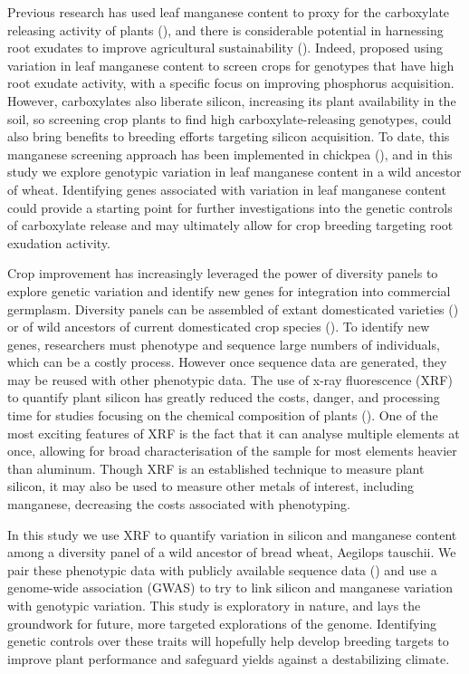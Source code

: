 \documentclass[12pt, letterpaper]{report}
\begin{document}
Previous research has used leaf manganese content to proxy for the carboxylate releasing activity of plants (\cite{lambers_leaf_2015}), and there is considerable potential in harnessing root exudates to improve agricultural sustainability (\cite{cornelis_soil_2022}). Indeed, \textcite{lambers_leaf_2015} proposed using variation in leaf manganese content to screen crops for genotypes that have high root exudate activity, with a specific focus on improving phosphorus acquisition. However, carboxylates also liberate silicon, increasing its plant availability in the soil, so screening crop plants to find high carboxylate-releasing genotypes, could also bring benefits to breeding efforts targeting silicon acquisition. To date, this manganese screening approach has been implemented in chickpea (\cite{pang_carboxylate-releasing_2018,wen2021addition}), and in this study we explore genotypic variation in leaf manganese content in a wild ancestor of wheat. Identifying genes associated with variation in leaf manganese content could provide a starting point for further investigations into the genetic controls of carboxylate release and may ultimately allow for crop breeding targeting root exudation activity. 

Crop improvement has increasingly leveraged the power of diversity panels to explore genetic variation and identify new genes for integration into commercial germplasm. Diversity panels can be assembled of extant domesticated varieties (\cite{wingen_establishing_2014}) or of wild ancestors of current domesticated crop species (\cite{gaurav_population_2021}). To identify new genes, researchers must phenotype and sequence large numbers of individuals, which can be a costly process. However once sequence data are generated, they may be reused with other phenotypic data. The use of x-ray fluorescence (XRF) to quantify plant silicon has greatly reduced the costs, danger, and processing time for studies focusing on the chemical composition of plants (\cite{reidinger_rapid_2012}). One of the most exciting features of XRF is the fact that it can analyse multiple elements at once, allowing for broad characterisation of the sample for most elements heavier than aluminum. Though XRF is an established technique to measure plant silicon, it may also be used to measure other metals of interest, including manganese, decreasing the costs associated with phenotyping.

In this study we use XRF to quantify variation in silicon and manganese content among a diversity panel of a wild ancestor of bread wheat, Aegilops tauschii. We pair these phenotypic data with publicly available sequence data (\cite{gaurav_population_2021}) and use a genome-wide association (GWAS) to try to link silicon and manganese variation with genotypic variation. This study is exploratory in nature, and lays the groundwork for future, more targeted explorations of the genome. Identifying genetic controls over these traits will hopefully help develop breeding targets to improve plant performance and safeguard yields against a destabilizing climate.
\end{document}
